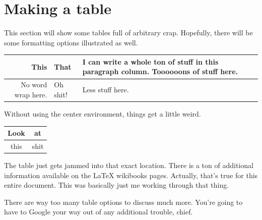 \documentclass{article} %
\begin{document}
\section{Making a table}

This section will show some tables full of arbitrary crap. Hopefully, there will be some formatting options illustrated as well.

\begin{center}
    \begin{tabular}{| r | l || p{50mm} |} %
        \hline %
        This & That & I can write a whole ton of stuff in this paragraph column. Toooooons of stuff here.\\ \hline
        No word wrap here. & Oh shit! & Less stuff here. \\
        \hline
    \end{tabular}
\end{center}

Without using the center environment, things get a little weird.
\hfill \\
\begin{tabular}{| c | c |}
    \hline
    Look & at \\ \hline
    this & shit \\
    \hline
\end{tabular}
The table just gets jammed into that exact location. There is a ton of additional information available on the LaTeX wikibooks pages. Actually, that's true for this entire document. This was basically just me working through that thing.

There are way too many table options to discuss much more. You're going to have to Google your way out of any additional trouble, chief.
\end{document}
